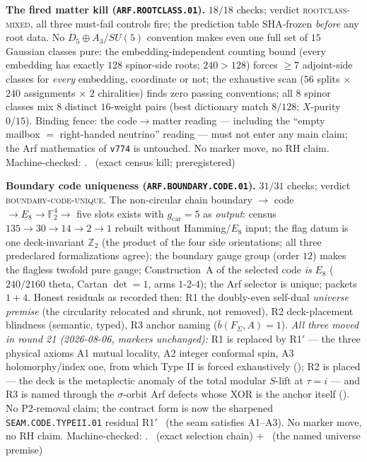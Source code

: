 \documentclass[11pt,a4paper]{article}
\newcommand{\gcar}{g_{\mathrm{car}}}
\newcommand{\Z}{\mathbb{Z}}
\theoremstyle{definition}
\begin{document}
\par\smallskip\noindent\textbf{The fired matter kill
(\texttt{ARF.ROOTCLASS.01}).}
$18/18$ checks; verdict \textsc{rootclass-mixed}, all three
must-fail controls fire; the prediction table SHA-frozen
\emph{before} any root data.  No $D_5{\oplus}A_3$/$SU(5)$
convention makes even one full set of $15$ Gaussian classes pure:
the embedding-independent counting bound (every embedding has
exactly $128$ spinor-side roots; $240>128$) forces $\ge7$
adjoint-side classes for \emph{every} embedding, coordinate or
not; the exhaustive scan ($56$ splits $\times$ $240$ assignments
$\times$ $2$ chiralities) finds zero passing conventions; all $8$
spinor classes mix $8$ distinct $16$-weight pairs (best dictionary
match $8/128$; $X$-purity $0/15$).  Binding fence: the
code$\to$matter reading --- including the ``empty mailbox $=$
right-handed neutrino'' reading --- must not enter any main claim;
the Arf mathematics of \texttt{v774} is untouched.  No marker
move, no RH claim.
Machine-checked: .
\mE\ (exact census kill; preregistered)
\par\smallskip

\par\smallskip\noindent\textbf{Boundary code uniqueness
(\texttt{ARF.BOUNDARY.CODE.01}).}
$31/31$ checks; verdict \textsc{boundary-code-unique}.  The
non-circular chain boundary $\to$ code $\to E_8\to\mathbb
F_2^4\to$ five slots exists with $\gcar=5$ as \emph{output}:
census $135\to30\to14\to2\to1$ rebuilt without Hamming/$E_8$
input; the flag datum is one deck-invariant $\Z_2$ (the product of
the four side orientations; all three predeclared formalizations
agree); the boundary gauge group (order $12$) makes the flagless
twofold pure gauge; Construction~A of the selected code \emph{is}
$E_8$ ($240/2160$ theta, Cartan $\det=1$, arms $1$-$2$-$4$); the
Arf selector is unique; packets $1+4$.  Honest residuals as
recorded then: R1 the doubly-even self-dual \emph{universe premise}
(the circularity relocated and shrunk, not removed), R2
deck-placement blindness (semantic, typed), R3 anchor naming
($\bar b(F_\Sigma,A)=1$).  \emph{All three moved in round 21
(2026-08-06, markers unchanged):} R1 is replaced by R1$'$ --- the
three physical axioms A1 mutual locality, A2 integer conformal
spin, A3 holomorphy/index one, from which Type II is forced
exhaustively (); R2 is placed
--- the deck is the metaplectic anomaly of the total modular
$S$-lift at $\tau=i$ --- and R3 is named through the
$\sigma$-orbit Arf defects whose XOR is the anchor itself
().  No P2-removal
claim; the contract form is now the sharpened
\texttt{SEAM.CODE.TYPEII.01} residual R1$'$ \mC\ (the seam
satisfies A1--A3).  No marker move, no RH claim.
Machine-checked: .
\mE\ (exact selection chain) $+$ \mO\ (the named universe premise)
\par\smallskip
\end{document}
